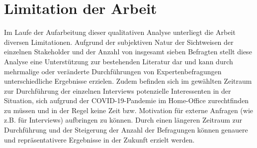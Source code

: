 \section{Limitation der Arbeit}
Im Laufe der Aufarbeitung dieser qualitativen Analyse unterliegt die Arbeit diversen Limitationen. Aufgrund der subjektiven Natur der Sichtweisen der einzelnen Stakeholder und der Anzahl von insgesamt sieben Befragten stellt diese Analyse eine Unterstützung zur bestehenden Literatur dar und kann durch mehrmalige oder veränderte Durchführungen von
Expertenbefragungen unterschiedliche Ergebnisse erzielen. Zudem befinden sich im gewählten Zeitraum zur Durchführung der einzelnen Interviews potenzielle Interessenten in der Situation, sich aufgrund der COVID-19-Pandemie im Home-Office zurechtfinden zu müssen und in der Regel keine Zeit bzw. Motivation für externe Anfragen (wie z.B. für Interviews)
aufbringen zu können. Durch einen längeren Zeitraum zur Durchführung und der Steigerung der Anzahl der Befragungen können genauere und repräsentativere Ergebnisse in der Zukunft erzielt werden. 